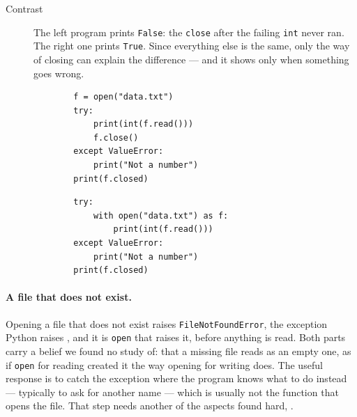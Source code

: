 \begin{description}
  \item[Contrast] The left program prints \texttt{False}: the
    \texttt{close} after the failing \texttt{int}
    never ran.
    The right one prints \texttt{True}.
    Since everything else is the same, only the way of closing can explain
    the difference --- and it shows only when something goes wrong.

    \hfill
    \begin{minipage}[t]{0.45\columnwidth}
      \begin{verbatim}
        f = open("data.txt")
        try:
            print(int(f.read()))
            f.close()
        except ValueError:
            print("Not a number")
        print(f.closed)
      \end{verbatim}
    \end{minipage}
    \hfill
    \begin{minipage}[t]{0.45\columnwidth}
      \begin{verbatim}
        try:
            with open("data.txt") as f:
                print(int(f.read()))
        except ValueError:
            print("Not a number")
        print(f.closed)
      \end{verbatim}
    \end{minipage}
\end{description}

\paragraph{A file that does not exist.}
Opening a file that does not exist raises
\texttt{FileNotFoundError}, the exception Python raises
, and it is \texttt{open} that raises it, before
anything is read.
Both parts carry a belief we found no study of: that a missing file reads
as an empty one, as if \texttt{open} for reading created it the
way opening for writing does.
The useful response is to catch the exception where the program knows what
to do instead --- typically to ask for another name --- which is usually not
the function that opens the file.
That step needs another of the aspects \textcite{RashkovitsLavy2012} found
hard, .

